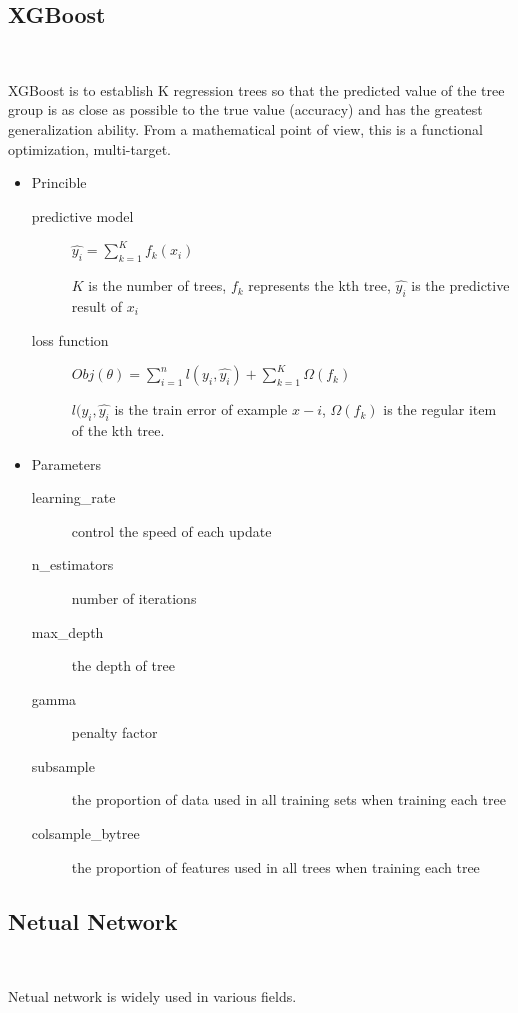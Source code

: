 \subsection{XGBoost}
\
 
XGBoost is to establish K regression trees 
so that the predicted value of 
the tree group is as close as possible to 
the true value (accuracy) and 
has the greatest generalization ability. 
From a mathematical point of view, 
this is a functional optimization, multi-target.

\begin{itemize}
	\item Princible
	\begin{description}
		\item[predictive model] $\hat{y_i}=\sum\nolimits_{k=1}^K f_k(x_i)$
		
		$K$ is the number of trees,
		$f_k$ represents the kth tree,
		$\hat{y_i}$ is the predictive result of $x_i$
		\item[loss function] $Obj(\theta)=\sum\nolimits_{i=1}^n l(y_i,\hat{y_i})+
		\sum\nolimits_{k=1}^K \Omega(f_k)$
		
		$l(y_i,\hat{y_i}$ is the train error of example 
		$x-i$, $\Omega(f_k)$ is the regular item of the kth tree.
	\end{description}
	
	\item Parameters
	\begin{description}
		\item[learning_rate]  control the speed of each update
		\item[n_estimators] number of iterations
		\item[max_depth] the depth of tree
		\item[gamma] penalty factor%
		\item[subsample] the proportion of data used in 
		all training sets when training each tree
		\item[colsample_bytree] the proportion of features used 
		in all trees when training each tree
	\end{description}
\end{itemize} 

\subsection{Netual Network}
\

Netual network is widely used in various fields.

